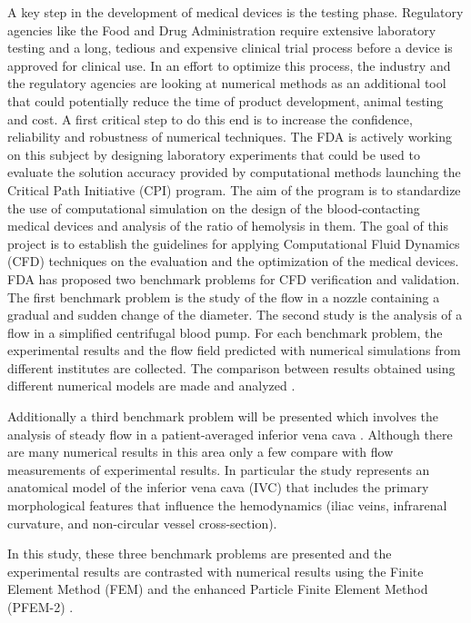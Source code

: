 A key step in the development of medical devices is the testing phase. Regulatory agencies like the Food and Drug Administration require extensive laboratory testing and a long, tedious and expensive clinical trial process before a device is approved for clinical use. In an effort to optimize this process, the industry and the regulatory agencies are looking at numerical methods as an additional tool that could potentially reduce the time of product development, animal testing and cost. A first critical step to do this end is to increase the confidence, reliability and robustness of numerical techniques. The FDA is actively working on this subject by designing laboratory experiments that could be used to evaluate the solution accuracy provided by computational methods launching the Critical Path Initiative (CPI) \cite{cpi} program. The aim of the program is to standardize the use of computational simulation on the design of the blood-contacting medical
devices and analysis of the ratio of hemolysis in them. The goal of this project is to establish the guidelines for
applying Computational Fluid Dynamics (CFD) techniques on the evaluation and the optimization of the medical devices. FDA has proposed two benchmark
problems \cite{cpi1} for CFD verification and validation. The first benchmark problem is the study of the flow in a nozzle
containing a gradual and sudden change of the diameter. The second study is the analysis of a flow in a simplified centrifugal
blood pump. For each benchmark
problem, the experimental results \cite{fda_res,fda_nozzle,fda_pump} and the flow field predicted with numerical simulations \cite{fda_numrob,hariharan_nozzle,nassau_pump,heck_hemo} from
different institutes are collected. The comparison between results obtained using different numerical models are
made and analyzed \cite{stewart_cfd,mali_cfd}. 

Additionally a third benchmark problem will be presented which involves the analysis of steady flow in a patient-averaged inferior vena cava \cite{gallagher_exp,craven_cfd}. Although there are many numerical results in this area only a few compare with flow measurements of experimental results. In particular the study represents an anatomical model of the  inferior vena cava (IVC) that includes the primary morphological features that influence the hemodynamics (iliac veins, infrarenal curvature, and non-circular vessel cross-section).

In this study, these three benchmark problems are presented and the experimental results are contrasted with numerical results using the Finite Element Method (FEM) and the enhanced Particle Finite Element Method (PFEM-2) \cite{sergio:pfem}.

